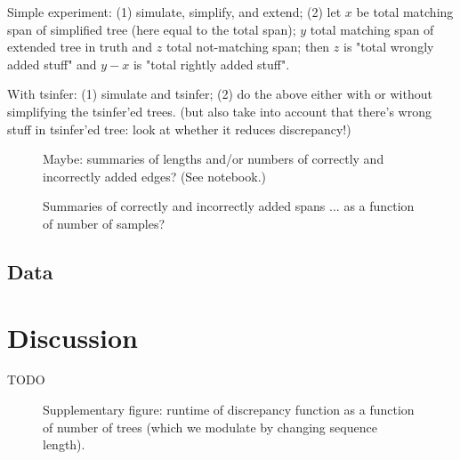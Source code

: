 \documentclass[10pt,twoside,lineno]{gsajnl}
\begin{document}
Simple experiment:
(1) simulate, simplify, and extend;
(2) let $x$ be total matching span of simplified tree (here equal to the total span); $y$ total matching span of extended tree in truth and $z$ total not-matching span;
then $z$ is "total wrongly added stuff" and $y-x$ is "total rightly added stuff".

With tsinfer: (1) simulate and tsinfer; (2) do the above either with or without simplifying the tsinfer'ed trees.
(but also take into account that there's wrong stuff in tsinfer'ed tree: look at whether it reduces discrepancy!)

\begin{figure}
    \caption{
        Maybe: summaries of lengths and/or numbers of correctly and incorrectly added edges?
        (See notebook.)
        \label{fig:results_edges}
    }
\end{figure}

\begin{figure}
    \caption{
        Summaries of correctly and incorrectly added spans
        ... as a function of number of samples?
        \label{fig:results_discrepancy}
    }
\end{figure}

\subsection{Data}



\section{Discussion}

TODO



\appendix

\begin{figure}
    \caption{
        Supplementary figure: runtime of discrepancy function as a function of number of trees
        (which we modulate by changing sequence length).
        \label{fig:speed_discrepancy}
    }
\end{figure}
\end{document}
